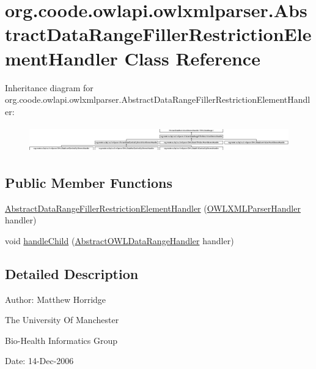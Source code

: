 \hypertarget{classorg_1_1coode_1_1owlapi_1_1owlxmlparser_1_1_abstract_data_range_filler_restriction_element_handler}{\section{org.\-coode.\-owlapi.\-owlxmlparser.\-Abstract\-Data\-Range\-Filler\-Restriction\-Element\-Handler Class Reference}
\label{classorg_1_1coode_1_1owlapi_1_1owlxmlparser_1_1_abstract_data_range_filler_restriction_element_handler}
}
Inheritance diagram for org.\-coode.\-owlapi.\-owlxmlparser.\-Abstract\-Data\-Range\-Filler\-Restriction\-Element\-Handler\-:\begin{figure}[H]
\begin{center}
\leavevmode
\includegraphics[height=1.152263cm]{classorg_1_1coode_1_1owlapi_1_1owlxmlparser_1_1_abstract_data_range_filler_restriction_element_handler}
\end{center}
\end{figure}
\subsection*{Public Member Functions}
\begin{DoxyCompactItemize}
\item 
\hyperlink{classorg_1_1coode_1_1owlapi_1_1owlxmlparser_1_1_abstract_data_range_filler_restriction_element_handler_a509799a155f936fe3c9a2218325866f2}{Abstract\-Data\-Range\-Filler\-Restriction\-Element\-Handler} (\hyperlink{classorg_1_1coode_1_1owlapi_1_1owlxmlparser_1_1_o_w_l_x_m_l_parser_handler}{O\-W\-L\-X\-M\-L\-Parser\-Handler} handler)
\item 
void \hyperlink{classorg_1_1coode_1_1owlapi_1_1owlxmlparser_1_1_abstract_data_range_filler_restriction_element_handler_ac66309404619296131a444bb89cdfa07}{handle\-Child} (\hyperlink{classorg_1_1coode_1_1owlapi_1_1owlxmlparser_1_1_abstract_o_w_l_data_range_handler}{Abstract\-O\-W\-L\-Data\-Range\-Handler} handler)
\end{DoxyCompactItemize}


\subsection{Detailed Description}
Author\-: Matthew Horridge\par
 The University Of Manchester\par
 Bio-\/\-Health Informatics Group\par
 Date\-: 14-\/\-Dec-\/2006\par
\par
 


